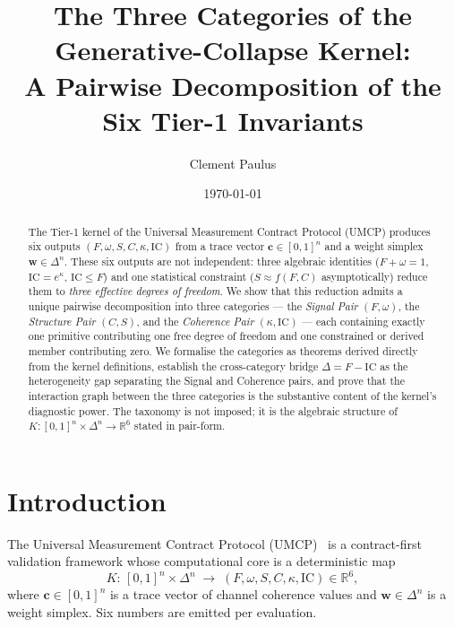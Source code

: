 \documentclass[
  aps,
  prd,
  twocolumn,
  superscriptaddress,
  nofootinbib,
  floatfix
]{revtex4-2}
\newcommand{\tvec}{\mathbf{c}}
\newcommand{\wvec}{\mathbf{w}}
\newcommand{\IC}{\mathrm{IC}}
\newcommand{\Real}{\mathbb{R}}
\begin{document}
\title{The Three Categories of the Generative-Collapse Kernel:\\
A Pairwise Decomposition of the Six Tier-1 Invariants}

\author{Clement Paulus}

\date{\today}

\begin{abstract}
The Tier-1 kernel of the Universal Measurement Contract Protocol
(UMCP) produces six outputs $(F,\omega,S,C,\kappa,\IC)$ from a
trace vector $\tvec\in[0,1]^n$ and a weight simplex $\wvec\in\Delta^n$.
These six outputs are not independent: three algebraic identities
($F+\omega=1$, $\IC=e^{\kappa}$, $\IC\le F$) and one statistical
constraint ($S\approx f(F,C)$ asymptotically) reduce them to
\emph{three effective degrees of freedom}.  We show that this
reduction admits a unique pairwise decomposition into three
categories --- the \emph{Signal Pair} $(F,\omega)$, the
\emph{Structure Pair} $(C,S)$, and the \emph{Coherence Pair}
$(\kappa,\IC)$ --- each containing exactly one primitive
contributing one free degree of freedom and one constrained or
derived member contributing zero.  We formalise the categories
as theorems derived directly from the kernel definitions,
establish the cross-category bridge $\Delta=F-\IC$ as the
heterogeneity gap separating the Signal and Coherence pairs,
and prove that the interaction graph between the three
categories is the substantive content of the kernel's diagnostic
power.  The taxonomy is not imposed; it is the algebraic
structure of $K:[0,1]^n\times\Delta^n\to\Real^6$ stated in
pair-form.
\end{abstract}

\maketitle

\section{Introduction}\label{sec:intro}

The Universal Measurement Contract Protocol
(UMCP)~\cite{paulus2025umcp,paulus2025physicscoherence,paulus2026umcpcasepack}
is a contract-first validation framework whose computational
core is a deterministic map
\begin{equation}\label{eq:kernel-map}
  K:\,[0,1]^n\times\Delta^n \;\longrightarrow\; (F,\omega,S,C,\kappa,\IC)\in\Real^6,
\end{equation}
where $\tvec\in[0,1]^n$ is a trace vector of channel coherence values
and $\wvec\in\Delta^n$ is a weight simplex.  Six numbers are emitted
per evaluation.
\end{document}
